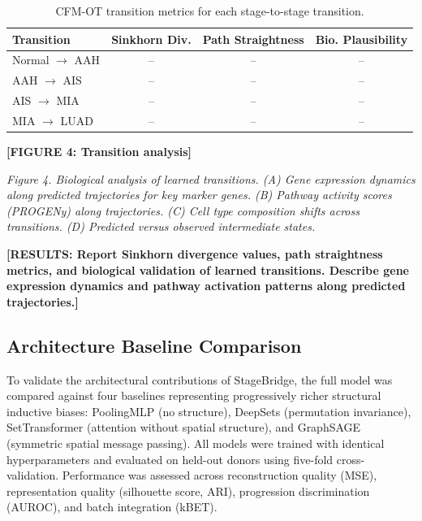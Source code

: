 \begin{table}[h]
\centering
\caption{CFM-OT transition metrics for each stage-to-stage transition.}
\label{tab:cfm_metrics}
\begin{tabular}{lccc}
\toprule
\textbf{Transition} & \textbf{Sinkhorn Div.} & \textbf{Path Straightness} & \textbf{Bio. Plausibility} \\
\midrule
Normal $\to$ AAH & -- & -- & -- \\
AAH $\to$ AIS & -- & -- & -- \\
AIS $\to$ MIA & -- & -- & -- \\
MIA $\to$ LUAD & -- & -- & -- \\
\bottomrule
\end{tabular}
\end{table}

\textbf{[FIGURE 4: Transition analysis]}

\textit{Figure 4. Biological analysis of learned transitions. (A) Gene expression dynamics along predicted trajectories for key marker genes. (B) Pathway activity scores (PROGENy) along trajectories. (C) Cell type composition shifts across transitions. (D) Predicted versus observed intermediate states.}

\textbf{[RESULTS: Report Sinkhorn divergence values, path straightness metrics, and biological validation of learned transitions. Describe gene expression dynamics and pathway activation patterns along predicted trajectories.]}


\subsection{Architecture Baseline Comparison}

To validate the architectural contributions of StageBridge, the full model was compared against four baselines representing progressively richer structural inductive biases: PoolingMLP (no structure), DeepSets (permutation invariance), SetTransformer (attention without spatial structure), and GraphSAGE (symmetric spatial message passing). All models were trained with identical hyperparameters and evaluated on held-out donors using five-fold cross-validation. Performance was assessed across reconstruction quality (MSE), representation quality (silhouette score, ARI), progression discrimination (AUROC), and batch integration (kBET).

